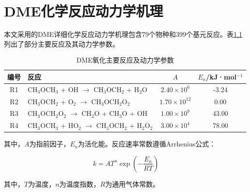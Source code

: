 \chapter{DME化学反应动力学机理}

本文采用的DME详细化学反应动力学机理包含79个物种和399个基元反应。表\ref{tab:mechanism}列出了部分主要反应及其动力学参数。

\begin{table}[htbp]
	\centering
	\caption{DME氧化主要反应及动力学参数}
	\label{tab:mechanism}
	\begin{tabular}{clcc}
		\toprule
		编号 & 反应 & $A$ & $E_a$/kJ·mol$^{-1}$ \\
		\midrule
		R1  & CH$_3$OCH$_3$ + OH $\rightarrow$ CH$_3$OCH$_2$ + H$_2$O & $2.40\times10^{6}$ & -3.24 \\
		R2  & CH$_3$OCH$_2$ + O$_2$ $\rightarrow$ CH$_3$OCH$_2$O$_2$ & $1.70\times10^{12}$ & 0.00 \\
		R3  & CH$_3$OCH$_2$O$_2$ $\rightarrow$ CH$_2$O + CH$_3$O + OH & $1.00\times10^{9}$ & 43.00 \\
		R4  & CH$_3$OCH$_3$ + HO$_2$ $\rightarrow$ CH$_3$OCH$_2$ + H$_2$O$_2$ & $3.00\times10^{4}$ & 78.00 \\
		\bottomrule
	\end{tabular}
\end{table}

其中，$A$为指前因子，$E_a$为活化能。反应速率常数遵循Arrhenius公式：

\begin{equation}
	k = A T^n \exp\left(-\frac{E_a}{RT}\right)
\end{equation}

其中，$T$为温度，$n$为温度指数，$R$为通用气体常数。
